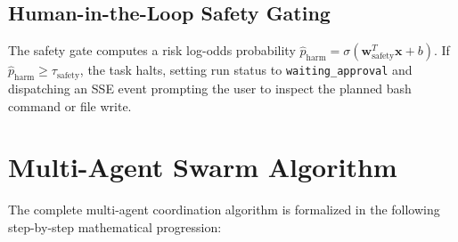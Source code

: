 \documentclass[12pt,a4paper]{report}
\begin{document}
\subsection{Human-in-the-Loop Safety Gating}
The safety gate computes a risk log-odds probability $\hat{p}_{\text{harm}} = \sigma(\mathbf{w}_{\text{safety}}^T \mathbf{x} + b)$. If $\hat{p}_{\text{harm}} \ge \tau_{\text{safety}}$, the task halts, setting run status to \texttt{waiting\_approval} and dispatching an SSE event prompting the user to inspect the planned bash command or file write.

\section{Multi-Agent Swarm Algorithm}
The complete multi-agent coordination algorithm is formalized in the following step-by-step mathematical progression:
\end{document}
